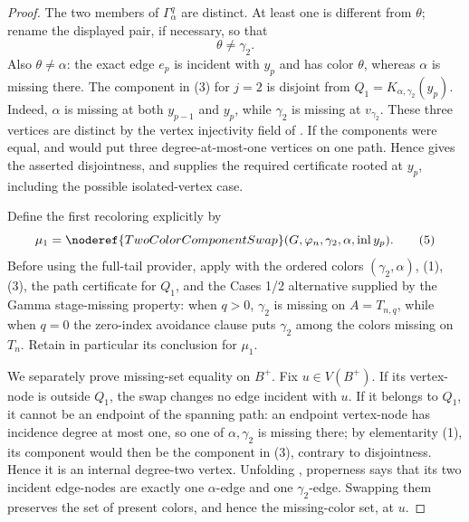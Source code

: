 \begin{proof}
The two members of \(\Gamma^q_\alpha\) are distinct.  At least one is
different from \(\theta\); rename the displayed pair, if necessary, so
that
\[
                           \theta\ne\gamma_2.                 \tag{4}
\]
Also \(\theta\ne\alpha\): the exact edge \(e_p\) is incident with
\(y_p\) and has color \(\theta\), whereas \(\alpha\) is missing there.
The component in (3) for \(j=2\) is disjoint from
\(Q_1=K_{\alpha,\gamma_2}(y_p)\).  Indeed, \(\alpha\) is missing at
both \(y_{p-1}\) and \(y_p\), while \(\gamma_2\) is missing at
\(v_{\gamma_2}\).  These three vertices are distinct by the vertex
injectivity field of .  If the components were
equal,  and
 would put three
degree-at-most-one vertices on one path.  Hence
 gives the asserted disjointness,
and  supplies the required
 certificate rooted at \(y_p\), including
the possible isolated-vertex case.

Define the first recoloring explicitly by
\[
 \mu_1=\noderef{TwoColorComponentSwap}
        (G,\varphi_n,\gamma_2,\alpha,\operatorname{inl}y_p).  \tag{5}
\]
Before using the full-tail provider, apply
 with the ordered colors
\((\gamma_2,\alpha)\), (1), (3), the path certificate for \(Q_1\), and
the Cases 1/2 alternative supplied by the Gamma stage-missing property:
when \(q>0\), \(\gamma_2\) is missing on
\(A=T_{n,q}\), while when \(q=0\) the zero-index avoidance clause puts
\(\gamma_2\) among the colors missing on \(T_n\).  Retain in particular its
 conclusion for \(\mu_1\).

We separately prove missing-set equality on \(B^+\).  Fix
\(u\in V(B^+)\).  If its vertex-node is outside \(Q_1\), the swap changes
no edge incident with \(u\).  If it belongs to \(Q_1\), it cannot be an
endpoint of the spanning path: an endpoint vertex-node has incidence
degree at most one, so one of \(\alpha,\gamma_2\) is missing there; by
elementarity (1), its component would then be the component in (3),
contrary to disjointness.  Hence it is an internal degree-two vertex.
Unfolding , properness says that its two
incident edge-nodes are exactly one \(\alpha\)-edge and one
\(\gamma_2\)-edge.  Swapping them preserves the set of present colors,
and hence the missing-color set, at \(u\).


\end{proof}

